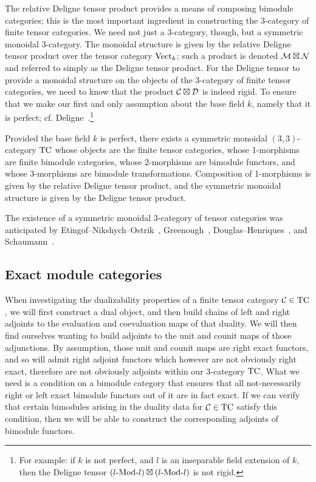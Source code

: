 \documentclass{amsart}
\begin{document}
The relative Deligne tensor product provides a means of composing bimodule categories; this is the most important ingredient in constructing the 3-category of finite tensor categories.  We need not just a 3-category, though, but a symmetric monoidal 3-category.  The monoidal structure is given by the relative Deligne tensor product over the tensor category $\mathrm{Vect}_k$; such a product is denoted $\mathcal M \boxtimes \mathcal N$ and referred to simply as the Deligne tensor product.  For the Deligne tensor to provide a monoidal structure on the objects of the 3-category of finite tensor categories, we need to know that the product $\mathcal C \boxtimes \mathcal D$ is indeed rigid.  To ensure that we make our first and only assumption about the base field $k$, namely that it is perfect; cf. Deligne~\cite[Prop 5.17]{deligne}.\footnote{For example: if $k$ is not perfect, and $l$ is an inseparable field extension of $k$, then the Deligne tensor $(\Mod{l}{l}) \boxtimes (\Mod{l}{l})$ is not rigid.} %

\begin{theorem}[\cite{3TC}] \label{thm:tcexists}
Provided the base field $k$ is perfect, there exists a symmetric monoidal $(3,3)$-category $\mathrm{TC}$ whose objects are the finite tensor categories, whose 1-morphisms are finite bimodule categories, whose 2-morphisms are bimodule functors, and whose 3-morphisms are bimodule transformations.  Composition of 1-morphisms is given by the relative Deligne tensor product, and the symmetric monoidal structure is given by the Deligne tensor product.
\end{theorem}

\nid The existence of a symmetric monoidal 3-category of tensor categories was anticipated by Etingof--Nikshych--Ostrik~\cite{0909.3140}, Greenough~\cite{0911.4979}, Douglas--Henriques~\cite{dh-ib}, and Schaumann~\cite{Schaumann-PhD}.

\subsection{Exact module categories} \label{sec:tc-exact}

When investigating the dualizability properties of a finite tensor category $\mathcal C \in \mathrm{TC}$, we will first construct a dual object, and then build chains of left and right adjoints to the evaluation and coevaluation maps of that duality.  We will then find ourselves wanting to build adjoints to the unit and counit maps of those adjunctions.  By assumption, those unit and counit maps are right exact functors, and so will admit right adjoint functors which however are not obviously right exact, therefore are not obviously adjoints within our 3-category $\mathrm{TC}$.  What we need is a condition on a bimodule category that ensures that all not-necessarily right or left exact bimodule functors out of it are in fact exact.  If we can verify that certain bimodules arising in the duality data for $\mathcal C \in \mathrm{TC}$ satisfy this condition, then we will be able to construct the corresponding adjoints of bimodule functors.
\end{document}
